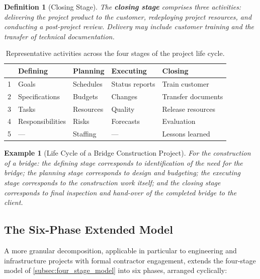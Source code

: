 \documentclass[12pt, a4paper]{report}
\theoremstyle{engnotes}
\newtheorem{defn}{Definition}[section]
\newtheorem{example}{Example}[section]
\begin{document}
\begin{defn}[Closing Stage]\label{def:closing_stage}
    The \textbf{closing stage} comprises three activities: delivering the project product to the customer, redeploying project resources, and conducting a post-project review. Delivery may include customer training and the transfer of technical documentation.
\end{defn}

\begin{table}[H]
    \centering
    \caption{Representative activities across the four stages of the project life cycle.}
    \label{tab:life_cycle_stages}
    \begin{tabularx}{\textwidth}{l X X X X}
        \toprule
        & \textbf{Defining} & \textbf{Planning} & \textbf{Executing} & \textbf{Closing} \\
        \midrule
        1 & Goals & Schedules & Status reports & Train customer \\
        2 & Specifications & Budgets & Changes & Transfer documents \\
        3 & Tasks & Resources & Quality & Release resources \\
        4 & Responsibilities & Risks & Forecasts & Evaluation \\
        5 & --- & Staffing & --- & Lessons learned \\
        \bottomrule
    \end{tabularx}
\end{table}

\begin{example}[Life Cycle of a Bridge Construction Project]\label{ex:bridge_life_cycle}
    For the construction of a bridge: the \emph{defining} stage corresponds to identification of the need for the bridge; the \emph{planning} stage corresponds to design and budgeting; the \emph{executing} stage corresponds to the construction work itself; and the \emph{closing} stage corresponds to final inspection and hand-over of the completed bridge to the client.
\end{example}

\subsection{The Six-Phase Extended Model}
\label{subsec:six_phase_model}

A more granular decomposition, applicable in particular to engineering and infrastructure projects with formal contractor engagement, extends the four-stage model of \cref{subsec:four_stage_model} into six phases, arranged cyclically:
\end{document}
